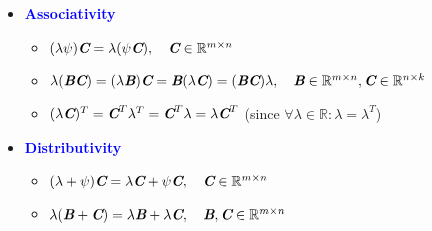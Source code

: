 \documentclass[12pt]{article}
\theoremstyle{definition}
\newcommand{\subkeyword}[1]{\textbf{\textcolor{blue}{#1}}}
\newcommand{\mat}[1]{\textit{\textbf{#1}}}
\newcommand{\transpose}[1]{\textit{\textbf{#1}}^{T}}
\newcommand{\rspace}[2]{\mathbb{R}^{#1 \times #2}}
\begin{document}
\begin{itemize}
                    \begin{itemize}
                        \item \subkeyword{Associativity}
                            \begin{itemize}
                                \item $(\lambda \psi)\mat{C}=\lambda(\psi\mat{C}), \quad \mat{C}\in\rspace{m}{n}$
                                \item $\lambda (\mat{B}\mat{C})=(\lambda\mat{B})\mat{C}=\mat{B}(\lambda\mat{C})=(\mat{B}\mat{C})\lambda, \quad \mat{B}\in\rspace{m}{n},\mat{C}\in\rspace{n}{k}$
                                \item $(\lambda \mat{C})^{T}=\transpose{C}\lambda^T=\transpose{C}\lambda=\lambda\transpose{C}$ (since $\forall\lambda\in\mathbb{R}: \lambda = \lambda^T$)
                            \end{itemize}
                        \item \subkeyword{Distributivity}
                            \begin{itemize}
                                \item $(\lambda+\psi)\mat{C}=\lambda\mat{C}+\psi\mat{C}, \quad\mat{C}\in\rspace{m}{n}$
                                \item $\lambda(\mat{B}+\mat{C})=\lambda\mat{B}+\lambda\mat{C}, \quad\mat{B},\mat{C}\in\rspace{m}{n}$
                            \end{itemize}
                    \end{itemize}
            \end{itemize}
        \newpage
\end{document}
